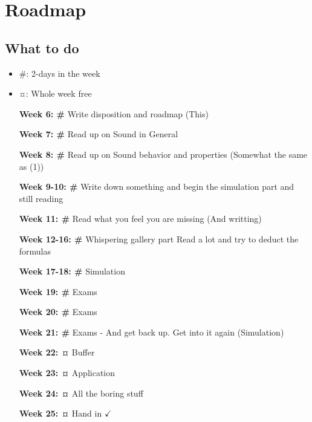 \documentclass[../main.tex]{subfiles}
\begin{document}


\section{Roadmap}

\subsection{What to do}

\begin{itemize}
    \item \#: 2-days in the week
    \item ¤: Whole week free
\end{itemize}

\begin{itemize}
    \item [\textbf{Week 6: \#}] Write disposition and roadmap (This)
    \item [\textbf{Week 7: \#}] Read up on Sound in General 
    \item [\textbf{Week 8: \#}] Read up on Sound behavior and properties (Somewhat the same as (1)) 
    \item [\textbf{Week 9-10: \#}] Write down something and begin the simulation part and still reading
    \item [\textbf{Week 11: \#}] Read what you feel you are missing (And writting) 
    \item [\textbf{Week 12-16: \#}] Whispering gallery part Read a lot and try to deduct the formulas
    \item [\textbf{Week 17-18: \#}] Simulation
    \item [\textbf{Week 19: \#}] Exams
    \item [\textbf{Week 20: \#}] Exams
    \item [\textbf{Week 21: \#}] Exams - And get back up. Get into it again (Simulation)
    \item [\textbf{Week 22: ¤}] Buffer
    \item [\textbf{Week 23: ¤}] Application
    \item [\textbf{Week 24: ¤}] All the boring stuff
    \item [\textbf{Week 25: ¤}] Hand in $\checkmark$
\end{itemize}
\end{document}
